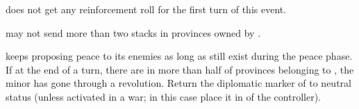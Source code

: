 \phadm
\aparag \HOLMin does not get any reinforcement roll for the first turn of this
event.

\phmil
\aparag \PRU may not send more than two stacks in provinces owned by \HOLmin.

\phpaix
\aparag \HOLMin keeps proposing peace to its enemies as long as \REVOLT still
exist during the peace phase.
\aparag If at the end of a turn, there are \REVOLT in more than half of
provinces belonging to \HOLmin, the minor has gone through a
revolution. Return the diplomatic marker of \HOLmin to neutral status (unless
activated in a war; in this case place it in \MA of the controller).




